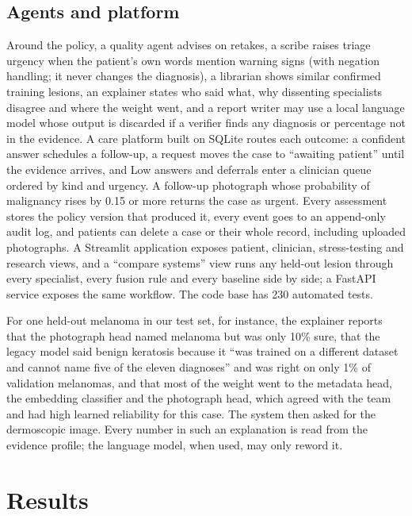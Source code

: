 \documentclass[conference]{IEEEtran}
\begin{document}
\subsection{Agents and platform}
Around the policy, a quality agent advises on retakes, a scribe raises triage urgency when the patient's own words mention warning signs (with negation handling; it never changes the diagnosis), a librarian shows similar confirmed training lesions, an explainer states who said what, why dissenting specialists disagree and where the weight went, and a report writer may use a local language model whose output is discarded if a verifier finds any diagnosis or percentage not in the evidence. A care platform built on SQLite routes each outcome: a confident answer schedules a follow-up, a request moves the case to ``awaiting patient'' until the evidence arrives, and Low answers and deferrals enter a clinician queue ordered by kind and urgency. A follow-up photograph whose probability of malignancy rises by 0.15 or more returns the case as urgent. Every assessment stores the policy version that produced it, every event goes to an append-only audit log, and patients can delete a case or their whole record, including uploaded photographs. A Streamlit application exposes patient, clinician, stress-testing and research views, and a ``compare systems'' view runs any held-out lesion through every specialist, every fusion rule and every baseline side by side; a FastAPI service exposes the same workflow. The code base has 230 automated tests.

For one held-out melanoma in our test set, for instance, the explainer reports that the photograph head named melanoma but was only 10\% sure, that the legacy model said benign keratosis because it ``was trained on a different dataset and cannot name five of the eleven diagnoses'' and was right on only 1\% of validation melanomas, and that most of the weight went to the metadata head, the embedding classifier and the photograph head, which agreed with the team and had high learned reliability for this case. The system then asked for the dermoscopic image. Every number in such an explanation is read from the evidence profile; the language model, when used, may only reword it.

\section{Results}
\end{document}

